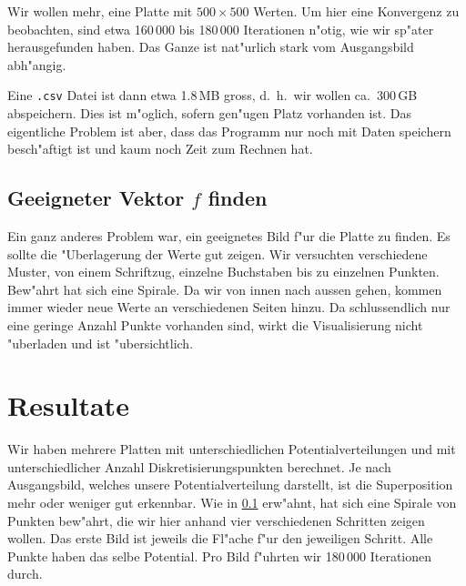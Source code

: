 \begin{refsection}
\begin{beispiel}
Wir wollen mehr, eine Platte mit $500 \times 500$ Werten. Um hier
eine Konvergenz zu beobachten, sind etwa 160\,000 bis 180\,000
Iterationen n"otig, wie wir sp"ater herausgefunden haben. Das Ganze
ist nat"urlich stark vom Ausgangsbild abh"angig.

Eine \texttt{.csv} Datei ist dann etwa 1.8\,MB gross, d.~h.~wir wollen ca.~300\,GB
abspeichern. Dies ist m"oglich, sofern gen"ugen Platz vorhanden
ist. Das eigentliche  Problem ist aber, dass das Programm nur noch
mit Daten speichern besch"aftigt ist und kaum noch Zeit zum Rechnen
hat.
\end{beispiel}
	
\subsection{Geeigneter Vektor $f$ finden}\label{sec:geeignetesF}

Ein ganz anderes Problem war, ein geeignetes Bild f"ur die Platte zu finden.
Es sollte die "Uberlagerung der Werte gut zeigen. Wir versuchten
verschiedene Muster, von einem Schriftzug, einzelne Buchstaben bis
zu einzelnen Punkten. Bew"ahrt hat sich eine Spirale. Da wir von
innen nach aussen gehen, kommen immer wieder neue Werte an verschiedenen
Seiten hinzu. Da schlussendlich nur eine geringe Anzahl Punkte
vorhanden sind, wirkt die Visualisierung nicht "uberladen und ist
"ubersichtlich.
		
\section{Resultate}
Wir haben mehrere Platten mit unterschiedlichen Potentialverteilungen
und mit unterschiedlicher Anzahl Diskretisierungspunkten berechnet.
Je nach Ausgangsbild, welches unsere Potentialverteilung darstellt,
ist die Superposition mehr oder weniger gut erkennbar. Wie in
\ref{sec:geeignetesF} erw"ahnt, hat sich eine Spirale von Punkten
bew"ahrt, die wir hier anhand vier verschiedenen Schritten zeigen
wollen. Das erste Bild ist jeweils die Fl"ache f"ur den jeweiligen
Schritt. Alle Punkte haben das selbe Potential. Pro Bild f"uhrten
wir 180\,000 Iterationen durch.


\end{refsection}
